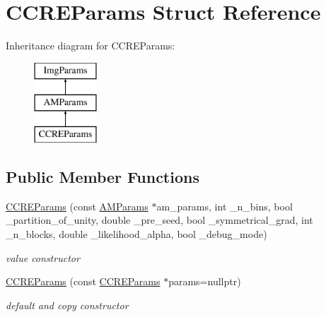 \hypertarget{structCCREParams}{\section{C\-C\-R\-E\-Params Struct Reference}
\label{structCCREParams}
}
Inheritance diagram for C\-C\-R\-E\-Params\-:\begin{figure}[H]
\begin{center}
\leavevmode
\includegraphics[height=3.000000cm]{structCCREParams}
\end{center}
\end{figure}
\subsection*{Public Member Functions}
\begin{DoxyCompactItemize}
\item 
\hypertarget{structCCREParams_ac2955cf417775818bbbe592797de0432}{\hyperlink{structCCREParams_ac2955cf417775818bbbe592797de0432}{C\-C\-R\-E\-Params} (const \hyperlink{structAMParams}{A\-M\-Params} $\ast$am\-\_\-params, int \-\_\-n\-\_\-bins, bool \-\_\-partition\-\_\-of\-\_\-unity, double \-\_\-pre\-\_\-seed, bool \-\_\-symmetrical\-\_\-grad, int \-\_\-n\-\_\-blocks, double \-\_\-likelihood\-\_\-alpha, bool \-\_\-debug\-\_\-mode)}\label{structCCREParams_ac2955cf417775818bbbe592797de0432}

\begin{DoxyCompactList}\small\item\em value constructor \end{DoxyCompactList}\item 
\hypertarget{structCCREParams_a9eebc2f5927952040ad0039b63088f9d}{\hyperlink{structCCREParams_a9eebc2f5927952040ad0039b63088f9d}{C\-C\-R\-E\-Params} (const \hyperlink{structCCREParams}{C\-C\-R\-E\-Params} $\ast$params=nullptr)}\label{structCCREParams_a9eebc2f5927952040ad0039b63088f9d}

\begin{DoxyCompactList}\small\item\em default and copy constructor \end{DoxyCompactList}\end{DoxyCompactItemize}
